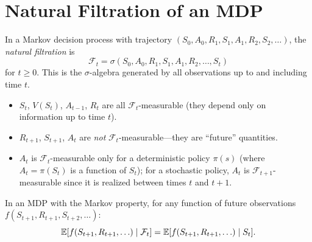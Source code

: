 \documentclass[11pt,a4paper]{article}
\begin{document}

\section{Natural Filtration of an MDP}
\label{sec:mdp_filtration}

\begin{definition}
\label{def:mdp_filtration}
In a Markov decision process with trajectory
$(S_0, A_0, R_1, S_1, A_1, R_2, S_2, \ldots)$,
the \emph{natural filtration} is
\begin{equation}
  \mathcal{F}_t
  = \sigma(S_0, A_0, R_1, S_1, A_1, R_2,
    \ldots, S_t)
  \label{eq:mdp_filtration}
\end{equation}
for $t \geq 0$.  This is the $\sigma$-algebra generated by all
observations up to and including time $t$.
\end{definition}

\begin{remark}
\begin{itemize}[nosep]
  \item $S_t$, $V(S_t)$, $A_{t-1}$, $R_t$ are all
    $\mathcal{F}_t$-measurable (they depend only on information
    up to time $t$).
  \item $R_{t+1}$, $S_{t+1}$, $A_t$ are \emph{not}
    $\mathcal{F}_t$-measurable---they are ``future'' quantities.
  \item $A_t$ is $\mathcal{F}_t$-measurable only for a
    deterministic policy $\pi(s)$ (where $A_t = \pi(S_t)$ is a
    function of $S_t$); for a stochastic policy, $A_t$ is
    $\mathcal{F}_{t+1}$-measurable since it is realized between
    times $t$ and $t+1$.
\end{itemize}
\end{remark}

\begin{proposition}
\label{prop:filtration_refine}
In an MDP with the Markov property, for any function of future
observations
$f(S_{t+1}, R_{t+1}, S_{t+2}, \ldots)$:
\begin{equation}
  \mathbb{E}[f(S_{t+1}, R_{t+1}, \ldots) \mid \mathcal{F}_t]
  = \mathbb{E}[f(S_{t+1}, R_{t+1}, \ldots) \mid S_t].
  \label{eq:markov_filtration}
\end{equation}
\end{proposition}
\end{document}

